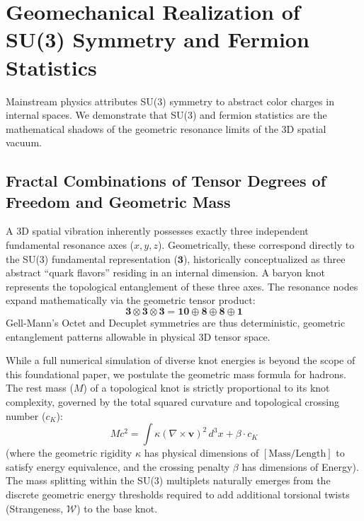 \documentclass[reprint,amsmath,amssymb,aps,prd]{revtex4-2}
\begin{document}
\section{Geomechanical Realization of SU(3) Symmetry and Fermion Statistics}

Mainstream physics attributes SU(3) symmetry to abstract color charges in internal spaces. We demonstrate that SU(3) and fermion statistics are the mathematical shadows of the geometric resonance limits of the 3D spatial vacuum.

\subsection{Fractal Combinations of Tensor Degrees of Freedom and Geometric Mass}
A 3D spatial vibration inherently possesses exactly three independent fundamental resonance axes ($x, y, z$). Geometrically, these correspond directly to the SU(3) fundamental representation ($\mathbf{3}$), historically conceptualized as three abstract ``quark flavors'' residing in an internal dimension. A baryon knot represents the topological entanglement of these three axes. The resonance nodes expand mathematically via the geometric tensor product:
\begin{equation}
\mathbf{3} \otimes \mathbf{3} \otimes \mathbf{3} = \mathbf{10} \oplus \mathbf{8} \oplus \mathbf{8} \oplus \mathbf{1}
\end{equation}
Gell-Mann's Octet and Decuplet symmetries are thus deterministic, geometric entanglement patterns allowable in physical 3D tensor space.

While a full numerical simulation of diverse knot energies is beyond the scope of this foundational paper, we postulate the geometric mass formula for hadrons. The rest mass ($M$) of a topological knot is strictly proportional to its knot complexity, governed by the total squared curvature and topological crossing number ($c_K$):
\begin{equation}
M c^2 = \int \kappa (\nabla \times \mathbf{v})^2 \, d^3x + \beta \cdot c_K
\end{equation}
(where the geometric rigidity $\kappa$ has physical dimensions of $[\mathrm{Mass}/\mathrm{Length}]$ to satisfy energy equivalence, and the crossing penalty $\beta$ has dimensions of Energy). The mass splitting within the SU(3) multiplets naturally emerges from the discrete geometric energy thresholds required to add additional torsional twists (Strangeness, $\mathcal{W}$) to the base knot.
\end{document}

